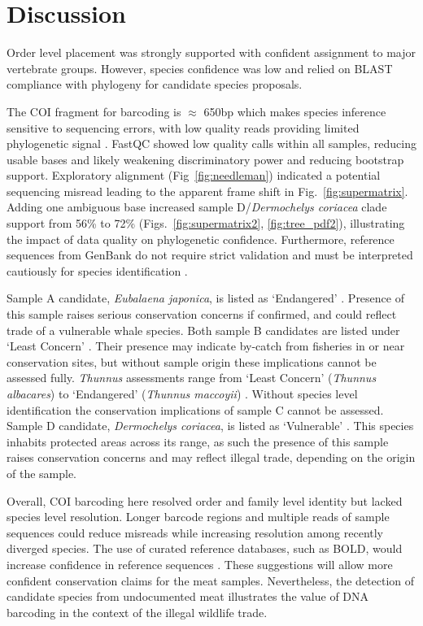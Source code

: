 \documentclass[11pt]{article}
\begin{document}
\section*{Discussion} %
Order level placement was strongly supported with confident assignment to major vertebrate groups. However, species confidence was low and relied on BLAST compliance with phylogeny for candidate species proposals.
\par The COI fragment for barcoding is $\approx$ 650bp which makes species inference sensitive to sequencing errors, with low quality reads providing limited phylogenetic signal \citep{ahmed2022pragmatic}. FastQC \citep{fastqc} showed low quality calls within all samples, reducing usable bases and likely weakening discriminatory power and reducing bootstrap support. Exploratory alignment (Fig~\ref{fig:needleman}) indicated a potential sequencing misread leading to the apparent frame shift in Fig.~\ref{fig:supermatrix}. Adding one ambiguous base increased sample D/\textit{Dermochelys coriacea} clade support from 56\% to 72\% (Figs.~\ref{fig:supermatrix2}, \ref{fig:tree_pdf2}), illustrating the impact of data quality on phylogenetic confidence. Furthermore, reference sequences from GenBank do not require strict validation and must be interpreted cautiously for species identification \citep{dawnay2007validation, meiklejohn2019assessment}. 
\par Sample A candidate, \textit{Eubalaena japonica}, is listed as `Endangered' \citep{eubalaena}. Presence of this sample raises serious conservation concerns if confirmed, and could reflect trade of a vulnerable whale species. Both sample B candidates are listed under `Least Concern' \citep{monodon, delphinapterus}. Their presence may indicate by-catch from fisheries in or near conservation sites, but without sample origin these implications cannot be assessed fully. \textit{Thunnus} assessments range from `Least Concern' (\textit{Thunnus albacares}) to `Endangered' (\textit{Thunnus maccoyii}) \citep{albacares, maccoyii}. Without species level identification the conservation implications of sample C cannot be assessed. Sample D candidate, \textit{Dermochelys coriacea}, is listed as `Vulnerable' \citep{dermochelys}. This species inhabits protected areas across its range, as such the presence of this sample raises conservation concerns and may reflect illegal trade, depending on the origin of the sample.
\par Overall, COI barcoding here resolved order and family level identity but lacked species level resolution. Longer barcode regions and multiple reads of sample sequences could reduce misreads while increasing resolution among recently diverged species. The use of curated reference databases, such as BOLD, would increase confidence in reference sequences \citep{meiklejohn2019assessment}. These suggestions will allow more confident conservation claims for the meat samples. Nevertheless, the detection of candidate species from undocumented meat illustrates the value of DNA barcoding in the context of the illegal wildlife trade. 
\end{document}
